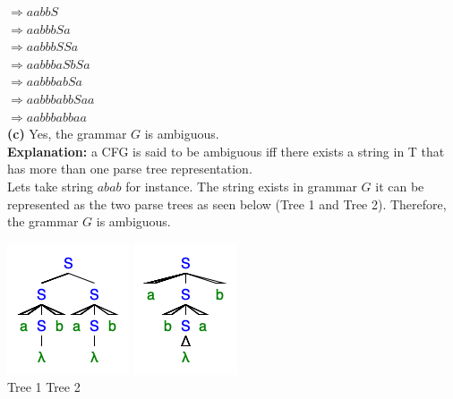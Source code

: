 \documentclass{homework}
\begin{document}
\phantom{x}\hspace{4ex} $\Rightarrow aabbS$ \\
\phantom{x}\hspace{4ex} $\Rightarrow aabbbSa$ \\
\phantom{x}\hspace{4ex} $\Rightarrow aabbbSSa$ \\
\phantom{x}\hspace{4ex} $\Rightarrow aabbbaSbSa$ \\
\phantom{x}\hspace{4ex} $\Rightarrow aabbbabSa$ \\
\phantom{x}\hspace{4ex} $\Rightarrow aabbbabbSaa$ \\
\phantom{x}\hspace{4ex} $\Rightarrow aabbbabbaa$ \\
\newline
\textbf{(c)}
Yes, the grammar $G$ is ambiguous.\\
\textbf{Explanation:}
a CFG is said to be ambiguous iff there exists a string in T that has more than one parse tree representation.\\
\newline
Lets take string $abab$ for instance. The string exists in grammar $G$ it can be represented as the two parse trees as seen below (Tree 1 and Tree 2). Therefore, the grammar $G$ is ambiguous.\\
\newline
\begin{center}
\includegraphics{a6q2c1.png}
\includegraphics{a6q2c2.png}
\\
Tree 1 \quad \quad \quad \quad \quad \quad \quad  \quad \quad Tree 2
\end{center}
\end{document}
